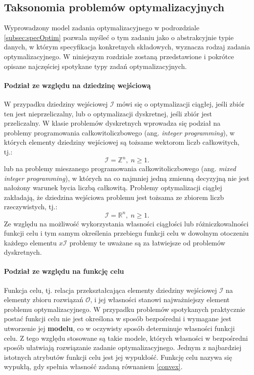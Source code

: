 \subsection{Taksonomia problemów optymalizacyjnych \label{subsec:takson}}

Wyprowadzony model zadania optymalizacyjnego w podrozdziale \ref{subsec:specOptim} pozwala 
myśleć o tym zadaniu jako o abstrakcyjnie typie danych, w którym specyfikacja konkretnych składowych, wyznacza rodzaj zadania optymalizacyjnego. W niniejszym rozdziale zostaną przedstawione i pokrótce opisane najczęściej spotykane typy zadań optymalizacyjnych. \\

\paragraph{Podział ze względu na dziedzinę wejściową \label{para:input}}

W przypadku dziedziny wejściowej $\mathcal{I}$ mówi się o optymalizacji ciągłej, jeśli zbiór ten jest nieprzeliczalny, lub o optymalizacji dyskretnej, jeśli zbiór jest przeliczalny. W klasie problemów dyskretnych wprowadza się podział na problemy programowania całkowitoliczbowego (ang. \textit{integer programming}), w których elementy dziedziny wejściowej są tożsame wektorom liczb całkowitych, tj.:
\begin{equation*}
    \mathcal{I} = \mathbb{Z}^{n},\; n \geq 1.
\end{equation*}
lub na problemy mieszanego programowania całkowitoliczbowego (ang. \textit{mixed integer programming}), w których na co najmniej jedną zmienną decyzyjną nie jest nałożony warunek bycia liczbą całkowitą. 
Problemy optymalizacji ciągłej zakładają, że dziedzina wejściowa problemu jest tożsama ze zbiorem liczb rzeczywistych, tj.:
\begin{equation*}
    \mathcal{I} = \mathbb{R}^{n},\; n \geq 1.
\end{equation*}
Ze względu na możliwość wykorzystania własności ciągłości lub różniczkowalności funkcji celu i tym samym określenia przebiegu funkcji celu w dowolnym otoczeniu każdego elementu $x \mathcal{I}$  problemy te uważane są za łatwiejsze od problemów dyskretnych.

\paragraph{Podział ze względu na funkcję celu}

Funkcja celu, tj. relacja przekształcająca elementy dziedziny wejściowej $\mathcal{I}$ na elementy zbioru rozwiązań $\mathcal{O}$, i jej własności stanowi najważniejszy element problemu optymalizacyjnego. W przypadku problemów spotykanych praktycznie postać funkcji celu nie jest określona w sposób bezpośredni i wymagane jest utworzenie jej \textbf{modelu}, co w oczywisty sposób determinuje własności funkcji celu. Z tego względu stosowane są takie modele, których własności w bezpośredni sposób ułatwiają rozwiązanie zadanie optymalizacyjnego. Jednym z najbardziej istotnych atrybutów funkcji celu jest jej wypukłość. Funkcję celu nazywa się wypukłą, gdy spełnia własność zadaną równaniem \ref{convex}.

